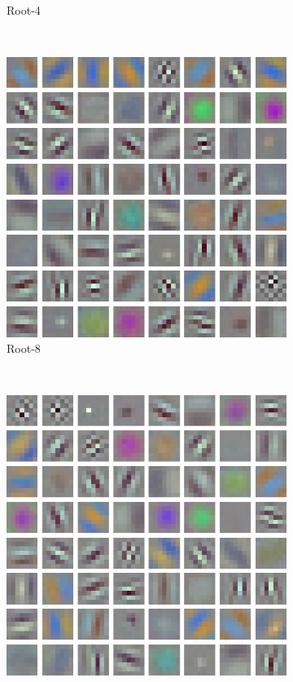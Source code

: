 \documentclass[thesis]{subfiles}
\begin{document}
\begin{figure}[tb]
\begin{subfigure}[b]{0.45\textwidth}
			\caption{Root-4}
			\label{fig:resnet50root4conv0}
		\end{subfigure}
		~
		\begin{subfigure}[b]{0.45\textwidth}
			\centering
			\includegraphics[width=\textwidth]{Figs/Raster/msrc-resnet-50-conv1-root16-convonly}
			\caption{Root-8}
			\label{fig:resnet50root8conv0}
		\end{subfigure}
		~
		\begin{subfigure}[b]{0.45\textwidth}
			\centering
			\includegraphics[width=\textwidth]{Figs/Raster/msrc-resnet-50-conv1-root32-convonly}

\end{subfigure}
\end{figure}
\end{document}
